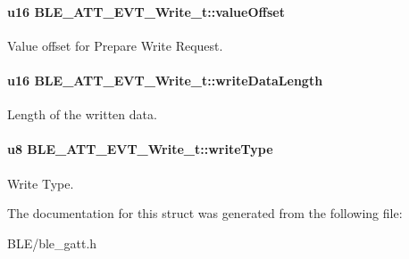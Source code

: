\paragraph[{\texorpdfstring{value\+Offset}{valueOffset}}]{\setlength{\rightskip}{0pt plus 5cm}u16 B\+L\+E\+\_\+\+A\+T\+T\+\_\+\+E\+V\+T\+\_\+\+Write\+\_\+t\+::value\+Offset}\hypertarget{struct_b_l_e___a_t_t___e_v_t___write__t_a730e34f88af2d5b0ba9e02a7bdb698ae}{}\label{struct_b_l_e___a_t_t___e_v_t___write__t_a730e34f88af2d5b0ba9e02a7bdb698ae}
Value offset for Prepare Write Request. 
\paragraph[{\texorpdfstring{write\+Data\+Length}{writeDataLength}}]{\setlength{\rightskip}{0pt plus 5cm}u16 B\+L\+E\+\_\+\+A\+T\+T\+\_\+\+E\+V\+T\+\_\+\+Write\+\_\+t\+::write\+Data\+Length}\hypertarget{struct_b_l_e___a_t_t___e_v_t___write__t_a4a8a607c349cdedb0e67f96463ca7c47}{}\label{struct_b_l_e___a_t_t___e_v_t___write__t_a4a8a607c349cdedb0e67f96463ca7c47}
Length of the written data. 
\paragraph[{\texorpdfstring{write\+Type}{writeType}}]{\setlength{\rightskip}{0pt plus 5cm}u8 B\+L\+E\+\_\+\+A\+T\+T\+\_\+\+E\+V\+T\+\_\+\+Write\+\_\+t\+::write\+Type}\hypertarget{struct_b_l_e___a_t_t___e_v_t___write__t_ab80fc4f4dda9f2b98b45bf1b71d1c9fe}{}\label{struct_b_l_e___a_t_t___e_v_t___write__t_ab80fc4f4dda9f2b98b45bf1b71d1c9fe}
Write Type. 

The documentation for this struct was generated from the following file\+:\begin{DoxyCompactItemize}
\item 
B\+L\+E/ble\+\_\+gatt.\+h\end{DoxyCompactItemize}
